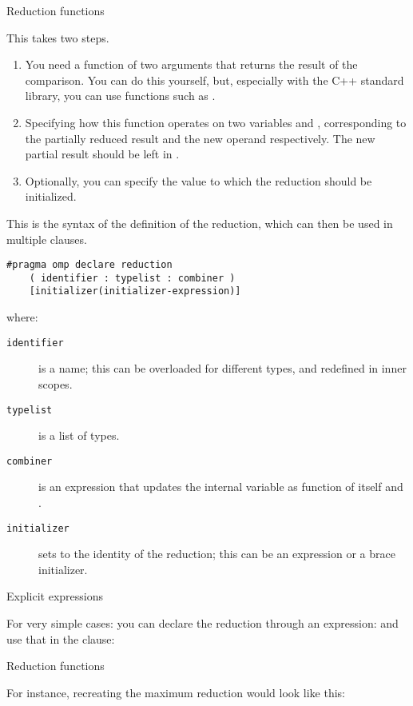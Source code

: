  {Reduction functions}

This takes two steps.
\begin{enumerate}
\item You need a function of two arguments that returns the result of
  the comparison. You can do this yourself, but, especially with the
  C++ standard library, you can use functions such as .
\item Specifying how this function operates on two variables
   and , corresponding to the
  partially reduced result and the new operand respectively. The new
  partial result should be left in .
\item Optionally, you can specify the value to which the reduction
  should be initialized.
\end{enumerate}

This is the syntax of the definition of the reduction, which can then
be used in multiple  clauses.
\begin{lstlisting}
#pragma omp declare reduction 
    ( identifier : typelist : combiner )
    [initializer(initializer-expression)]
\end{lstlisting}
where:
\begin{description}
  \item[\texttt{identifier}] is a name; this can be overloaded for
    different types, and redefined in inner scopes.
  \item[\texttt{typelist}] is a list of types.
  \item[\texttt{combiner}] is an expression that updates the internal
    variable  as function of itself and .
  \item[\texttt{initializer}] sets  to the
    identity of the reduction; this
    can be an expression or a brace initializer.
\end{description}

 {Explicit expressions}

For very simple cases:
%
%
you can declare the reduction through an expression:
%
%
and use that in the  clause:
%

 {Reduction functions}

For instance, recreating the maximum reduction would look like this:
%

